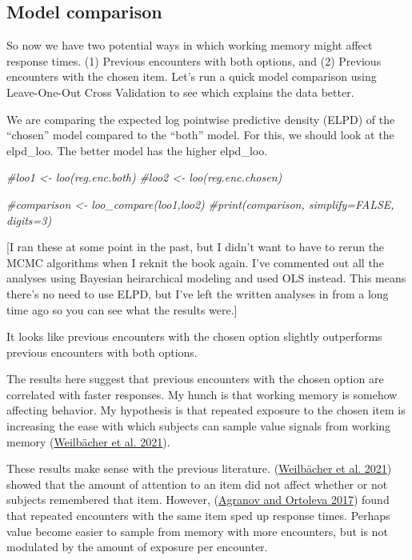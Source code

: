 \documentclass[
]{book}
\newenvironment{Shaded}{\begin{snugshade}}{\end{snugshade}}
\newcommand{\CommentTok}[1]{\textcolor[rgb]{0.56,0.35,0.01}{\textit{#1}}}
\begin{document}
\hypertarget{model-comparison}{%
\subsection{Model comparison}\label{model-comparison}}

So now we have two potential ways in which working memory might affect response times. (1) Previous encounters with both options, and (2) Previous encounters with the chosen item. Let's run a quick model comparison using Leave-One-Out Cross Validation to see which explains the data better.

We are comparing the expected log pointwise predictive density (ELPD) of the ``chosen'' model compared to the ``both'' model. For this, we should look at the elpd\_loo. The better model has the higher elpd\_loo.

\begin{Shaded}
\begin{Highlighting}[]
\CommentTok{\#loo1 \textless{}{-} loo(reg.enc.both)}
\CommentTok{\#loo2 \textless{}{-} loo(reg.enc.chosen)}

\CommentTok{\#comparison \textless{}{-} loo\_compare(loo1,loo2)}
\CommentTok{\#print(comparison, simplify=FALSE, digits=3)}
\end{Highlighting}
\end{Shaded}

{[}I ran these at some point in the past, but I didn't want to have to rerun the MCMC algorithms when I reknit the book again. I've commented out all the analyses using Bayesian heirarchical modeling and used OLS instead. This means there's no need to use ELPD, but I've left the written analyses in from a long time ago so you can see what the results were.{]}

It looks like previous encounters with the chosen option slightly outperforms previous encounters with both options.

The results here suggest that previous encounters with the chosen option are correlated with faster responses. My hunch is that working memory is somehow affecting behavior. My hypothesis is that repeated exposure to the chosen item is increasing the ease with which subjects can sample value signals from working memory (\protect\hyperlink{ref-weilbacher2021}{Weilbächer et al. 2021}).

These results make sense with the previous literature. (\protect\hyperlink{ref-weilbacher2021}{Weilbächer et al. 2021}) showed that the amount of attention to an item did not affect whether or not subjects remembered that item. However, (\protect\hyperlink{ref-agranov2017}{Agranov and Ortoleva 2017}) found that repeated encounters with the same item sped up response times. Perhaps value become easier to sample from memory with more encounters, but is not modulated by the amount of exposure per encounter.
\end{document}
